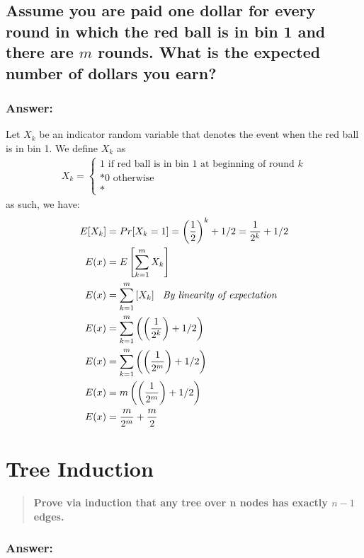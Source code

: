 \documentclass[titlepage]{article}
\theoremstyle{definition}
\begin{document}
  \subsection{Assume you are paid one dollar for every round in which the red
    ball is in bin 1 and there are $m$ rounds. What is the expected number of
    dollars you earn?}
    \subsubsection{Answer:}
      Let $X_k$ be an indicator random variable that denotes the event when the red
      ball is in bin 1. We define $X_k$ as 
      \begin{align}
        X_k = \begin{cases} 1 \text{ if red ball is in bin 1 at beginning of round }k \\*
                            0 \text{ otherwise }\\*
        \end{cases}
      \end{align}
      as such, we have:
      \begin{align*}
        E[X_k] &= Pr[X_k = 1] = \left(\frac{1}{2}\right)^k + 1/2  = \frac{1}{2^k} + 1/2 \\*
        E(x) &= E\left[ \sum_{k=1}^m X_k \right] \\*
        E(x) &= \sum_{k=1}^m \left[X_k \right] \text{ \emph{ By linearity of expectation}}\\*
        E(x) &= \sum_{k=1}^m \left( \left( \frac{1}{2^k}\right) + 1/2 \right) \\*
        E(x) &= \sum_{k=1}^m \left( \left( \frac{1}{2^m}\right) + 1/2 \right) \\*
        E(x) &= m \left( \left( \frac{1}{2^m}\right) + 1/2 \right) \\*
        E(x) &= \frac{m}{2^m} + \frac{m}{2}
      \end{align*}


\section{Tree Induction}
\begin{quote}
  \textbf{Prove via induction that any tree over n nodes has exactly $n-1$
  edges. }
\end{quote}

\subsubsection{Answer:}
\end{document}
